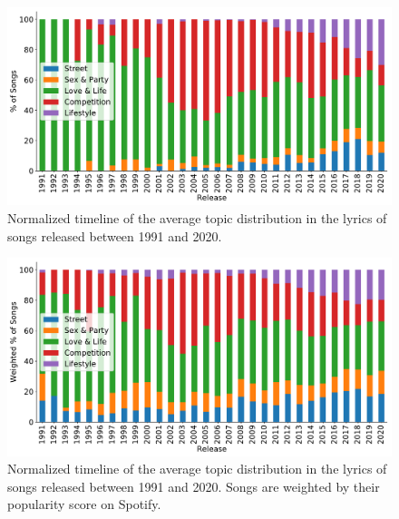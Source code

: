 \documentclass[conference]{IEEEtran}
\begin{document}
\begin{figure}[!t]
\includegraphics[width=\linewidth]{figures/timeline.pdf}
\vspace*{-8mm}
\caption{Normalized timeline of the average topic distribution in the lyrics of songs released between 1991 and 2020.}
\label{fig:timeline}
\end{figure}

\begin{figure}[!t]
\includegraphics[width=\linewidth]{figures/w_timeline.pdf}
\vspace*{-8mm}
\caption{Normalized timeline of the average topic distribution in the lyrics of songs released between 1991 and 2020. Songs are weighted by their popularity score on Spotify.}
\label{fig:w_timeline}
\end{figure}
\end{document}

